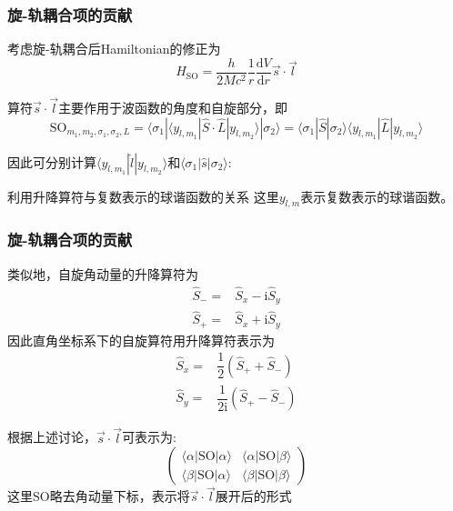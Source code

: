 \frame
{
	\frametitle{旋-轨耦合项的贡献}
	考虑旋-轨耦合后\textrm{Hamiltonian}的修正为
	\begin{displaymath}
		H_{\mathrm{SO}}=\dfrac{h}{2Mc^2}\dfrac1{r}\dfrac{\mathrm{d}V}{\mathrm{d}r}\vec{s}\cdot\vec{l}
	\end{displaymath}

	算符$\vec{s}\cdot\vec{l}$主要作用于波函数的角度和自旋部分，即
\begin{displaymath}
	\mathrm{SO}_{m_1,m_2,\sigma_1,\sigma_2,L}=\langle\sigma_1|\langle y_{l,m_1}|\hat S\cdot\hat L|y_{l,m_2}\rangle|\sigma_2\rangle=\langle\sigma_1|\hat S|\sigma_2\rangle\langle y_{l,m_1}|\hat L|y_{l,m_2}\rangle
\end{displaymath}

因此可分别计算$\langle y_{l,m_1}|\hat l|y_{l,m_2}\rangle$和$\langle\sigma_1|\hat s|\sigma_2\rangle$:

利用升降算符与复数表示的球谐函数的关系
	{	\fontsize{8.2pt}{4.2pt}}
这里$y_{l,m}$表示复数表示的球谐函数。

}

\frame
{
	\frametitle{旋-轨耦合项的贡献}
类似地，自旋角动量的升降算符为
\begin{displaymath}
	\begin{aligned}
		\hat S_-=&\hat S_x-\mathrm{i}\hat S_y\\
		\hat S_+=&\hat S_x+\mathrm{i}\hat S_y
	\end{aligned}
\end{displaymath}
因此直角坐标系下的自旋算符用升降算符表示为
\begin{displaymath}
	\begin{aligned}
		\hat S_x=&\dfrac12(\hat S_++\hat S_-)\\
		\hat S_y=&\dfrac1{2\mathrm{i}}(\hat S_+-\hat S_-)
	\end{aligned}
\end{displaymath}

根据上述讨论，$\vec{s}\cdot\vec{l}$可表示为:
\begin{displaymath}
	\begin{pmatrix}
		\langle\alpha|\mathrm{SO}|\alpha\rangle &\langle\alpha|\mathrm{SO}|\beta\rangle \\
		\langle\beta|\mathrm{SO}|\alpha\rangle &\langle\beta|\mathrm{SO}|\beta\rangle
	\end{pmatrix}
\end{displaymath}
这里$\mathrm{SO}$略去角动量下标，表示将$\vec s\cdot\vec l$展开后的形式
}

